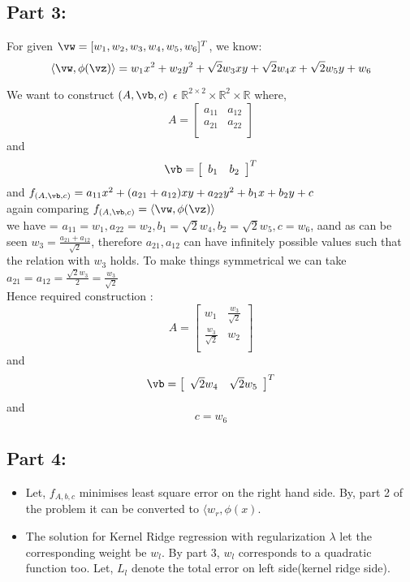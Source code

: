 \documentclass[a4paper,11pt]{article}
\begin{document}
\begin{mlsolution}
\subsection*{Part 3:}

For given $\vw = [w_1,w_2,w_3,w_4,w_5,w_6]^T$, we know:
$$\langle\vw,\phi(\vz)\rangle = w_1x^2 + w_2y^2 + \sqrt{2}w_3xy +\sqrt{2} w_4x +\sqrt{2} w_5y + w_6$$

We want to construct $(A,\vb,c)$ $\epsilon$ $\mathbb{R}^{2\times 2}\times\mathbb{R}^2\times\mathbb{R}$ where, \[
   A=
  \left[ {\begin{array}{cc}
   a_{11} & a_{12} \\
   a_{21} & a_{22} \\
  \end{array} } \right]
\]and \[\vb =  \left[ {\begin{array}{cc}
   b_1 & b_2 \\
  \end{array} } \right]^T
  \]
  and $f_{(A,\vb,c)} = a_{11}x^2 + (a_{21} + a_{12})xy + a_{22}y^2 + b_1x + b_2y + c$\\  
  
  again comparing $f_{(A,\vb,c)} = \langle\vw,\phi(\vz)\rangle$ \\
  we have = $a_{11} = w_{1},a_{22} = w_{2}, b_1 = \sqrt{2}w_4,b_2 = \sqrt{2}w_5,c = w_6$, aand as can be seen $w_3 = \frac{a_{21} + a_{12}}{\sqrt{2}}$, therefore $a_{21},a_{12}$ can have infinitely possible values such that the relation with $w_3$ holds. To make things symmetrical we can take $a_{21} = a_{12} = \frac{\sqrt{2}w_3}{2} = \frac{w_3}{\sqrt{2}}$ \\
  
  Hence required construction :\[
   A=
  \left[ {\begin{array}{cc}
   w_{1} & \frac{w_3}{\sqrt{2}} \\
   \frac{w_3}{\sqrt{2}} & w_{2} \\
  \end{array} } \right]
\]and \[\vb =  \left[ {\begin{array}{cc}
   \sqrt{2}w_4 & \sqrt{2}w_5 \\
  \end{array} } \right]^T
  \]
  and $$c = w_6$$
 
\subsection*{Part 4:}
\begin{itemize}
\item Let, $f_{A,b,c}$ minimises least square error on the right hand side. By, part 2 of the problem it can be converted to $\langle w_r,\phi(x)$.
\item The solution for Kernel Ridge regression with regularization $\lambda$ let the corresponding weight be $w_l$. By part 3, $w_l$ corresponds to a quadratic function too.  Let, $L_l$ denote the total error on left side(kernel ridge side).
\end{itemize}


\end{mlsolution}
\end{document}
